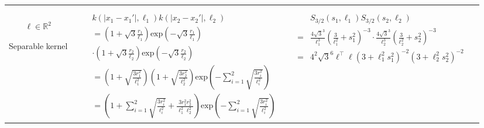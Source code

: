 \documentclass[onecolumn,a4paper,11pt]{article}
\begin{document}
\begin{landscape}
\begin{table}[H]
\begin{center}
\begin{tabular}{|c|c|c|c|}
       & \multicolumn{1}{|p{6.2cm}|}{\small

       } \\  
       \vspace{-10mm}\\
       \cline{1-3}
       
       \multicolumn{1}{|p{1.5cm}|}{
       \vspace{1mm}
       $\bm{\ell} \in \mathbb{R}^2$
       
       {Separable kernel} 
       }
       
        & \multicolumn{1}{|p{7.2cm}|}{\small
         \begin{eqnarray*}
		&&k(|x_1-x_1'|,\ell_1)k(|x_2-x_2'|,\ell_2) \\
		&&= \left(1+\sqrt{3}\frac{r_1}{\ell_1}\right)\mathrm{exp}\left(-\sqrt{3}\frac{r_1}{\ell_1} \right)\\
		&&\cdot \left(1+\sqrt{3}\frac{r_2}{\ell_2}\right)\mathrm{exp}\left(-\sqrt{3}\frac{r_2}{\ell_2} \right) \\
		&&= \left(1+\sqrt{\frac{3r_1^2}{\ell_1^2}}\right)\left(1+\sqrt{\frac{3r_2^2}{\ell_2^2}}\right)\mathrm{exp}\left(-\sum_{i=1}^{2}\sqrt{\frac{3r_i^2}{\ell_i^2}} \right) \\
		&&= \left(1+\sum_{i=1}^{2}\sqrt{\frac{3r_i^2}{\ell_i^2}}+\frac{3r_1^2r_2^2}{\ell_1^2\ell_2^2}\right)\mathrm{exp}\left(-\sum_{i=1}^{2}\sqrt{\frac{3r_i^2}{\ell_i^2}} \right)
         \end{eqnarray*}
       }
       
       & \multicolumn{1}{|p{7.2cm}|}{\small
         \begin{eqnarray*}
         &&S_{3/2}(s_1,\ell_1)S_{3/2}(s_2,\ell_2) \\
		&=& \frac{4\sqrt{3}^3}{\ell_1^3}\left(\frac{3}{\ell_1^2}+s_1^2 \right)^{-3} \cdot \frac{4\sqrt{3}^3}{\ell_2^3}\left(\frac{3}{\ell_2^2}+s_2^2 \right)^{-3}\\ 
		&=& 4^2\sqrt{3}^6\bm{\ell}^\top\bm{\ell}\left(3+\ell_1^2s_1^2 \right)^{-2} \left(3+\ell_2^2s_2^2 \right)^{-2}\\        
		\end{eqnarray*}        
       } 

       & \multicolumn{1}{|p{6.2cm}|}{\small

       } \\ 
       
       \hline
    \end{tabular}
  \end{center}
\end{table}

\end{landscape}
\end{document}
